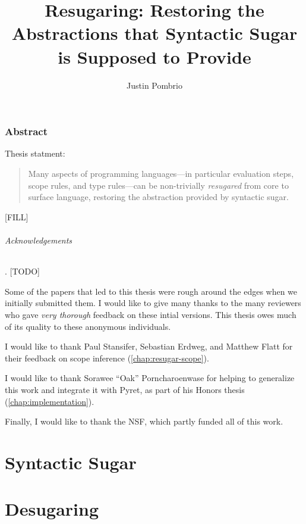 \documentclass[
  10pt,
  paper=letter,
  footinclude=true,
  headinclude=true,
  american
]{scrbook}
\renewcommand{\<}{\le}
\begin{document}

\author{Justin Pombrio}
\title{Resugaring: Restoring the Abstractions that Syntactic Sugar is Supposed to Provide}
\maketitle


\section{Abstract}
  Thesis statment:
\begin{quote}
Many aspects of programming languages---in particular evaluation
steps, scope rules, and type rules---can be non-trivially
\emph{resugared} from core to surface language, restoring the
abstraction provided by syntactic sugar.
\end{quote}

[FILL]


\paragraph{Acknowledgements}. [TODO]

Some of the papers that led to this thesis were rough around the edges
when we initially submitted them. I would like to give many thanks to
the many reviewers who gave \emph{very thorough} feedback on these
intial versions. This thesis owes much of its quality to these
anonymous individuals.

I would like to thank Paul Stansifer, Sebastian Erdweg, and Matthew
Flatt for their feedback on scope inference
(\cref{chap:resugar-scope}).

I would like to thank Sorawee ``Oak'' Porncharoenwase for helping to
generalize this work and integrate it with Pyret, as part of his
Honors thesis (\cref{chap:implementation}).

Finally, I would like to thank the NSF, which partly funded all of this work.

\part{Syntactic Sugar}
%
%
\part{Desugaring}
%
%
\end{document}
